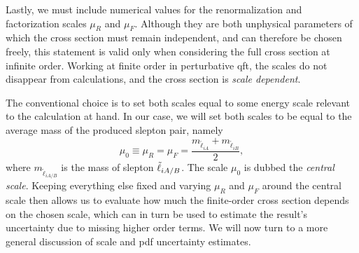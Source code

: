 
Lastly, we must include numerical values for the renormalization and factorization scales $\mu_R$ and $\mu_F$.
Although they are both unphysical parameters of which the cross section must remain independent, and can therefore be chosen freely, this statement is valid only when considering the full cross section at infinite order.
Working at finite order in perturbative \gls{qft}, the scales do not disappear from calculations, and the cross section is \emph{scale dependent}.

The conventional choice is to set both scales equal to some energy scale relevant to the calculation at hand.
In our case, we will set both scales to be equal to the average mass of the produced slepton pair, namely
\begin{equation}\label{eq:scale_central}
    \mu_0 \equiv \mu_R = \mu_F = \frac{m_{\tilde{\ell}_{iA}} + m_{\tilde{\ell}_{iB}}}{2},
\end{equation}
where $m_{\tilde{\ell}_{iA/B}}$ is the mass of slepton ${\tilde{\ell}}_{iA/B}$.
The scale $\mu_0$ is dubbed the \emph{central scale}.
Keeping everything else fixed and varying $\mu_R$ and $\mu_F$ around the central scale then allows us to evaluate how much the finite-order cross section depends on the chosen scale, which can in turn be used to estimate the result's uncertainty due to missing higher order terms.
We will now turn to a more general discussion of scale and \gls{pdf} uncertainty estimates.





